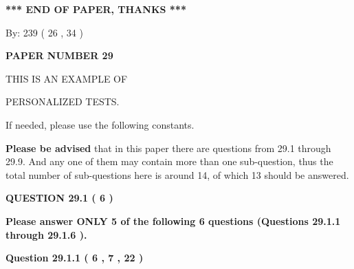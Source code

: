 \documentclass[12pt]{article}
\begin{document}
   
   
   
   
\vspace{1.0in} 
{\textbf{\large{ *** END OF PAPER, THANKS *** }}} 
   
   
\hspace{1.0in} By: 
         239 (          26 ,           34 )
   
   
   
   
\newpage 
\setcounter{page}{ 
    29001 } 
   
   
   
   
 {\textbf{ \Large{ PAPER NUMBER           29  }}}
   
   
\vspace{0.2in}
   
   
   
   
   
   
 \vspace{0.2in}
 
 
{\Huge  THIS IS AN EXAMPLE OF}
 
{\Huge  PERSONALIZED TESTS. }
 
If needed, please use the following constants.
 
 
 
{\textbf{\large{Please be advised}}} that in this paper there are questions from
29.1 through
29.9.
And any one of them may contain more than one sub-question, thus the total number
of sub-questions here is around 14, of which
13 should be answered.
 
\vspace{0.3in}
 
 
   
   
  
\vspace{0.2in}
  
{\textbf{\Large{QUESTION
29.1 
 (           6 )
}}}
  
  
{\textbf{\Large{Please answer ONLY  %
           5  %
 of the following  %
           6  %
 questions (Questions  %
29.1.1 %
 through  %
29.1.6 %
 ). }}}
   
   
  
\vspace{0.2in}
  
{\textbf{\Large{Question
29.1.1 
 (           6 ,           7 ,          22 )
}}}
  
  
 
 
\noindent{}
 
\end{document}
